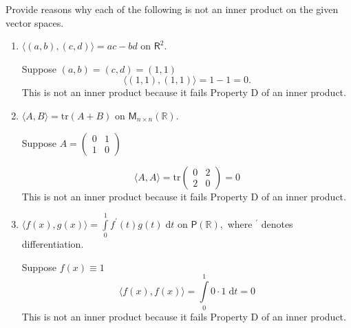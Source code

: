 Provide reasons why each of the following is not an inner product on
the given vector spaces.
\begin{enumerate}
\item $\langle(a,b),(c,d)\rangle = ac - bd$ on $\mathsf{R}^2.$

Suppose $(a,b) = (c,d) = (1,1)$
\begin{equation}
\langle (1,1),(1,1) \rangle = 1 - 1 = 0.
\end{equation}
This is not an inner product because it fails Property D of an inner
product.
\item $\langle A,B \rangle = \text{tr}(A+B)$ on $\mathsf{M}_{n\times
    n}(\mathbb{R}).$

Suppose $A = \left(\begin{smallmatrix} 0 & 1 \\ 1 &
    0\end{smallmatrix}\right)$

\begin{equation}
\langle A, A \rangle = \text{tr}\begin{pmatrix} 0  & 2 \\2 &
  0\end{pmatrix} = 0
\end{equation}
This is not an inner product because it fails Property D of an inner
product.
\item $\langle f(x),g(x) \rangle =
  \int\limits^1_0f^\prime(t)g(t) \; \mathrm{d}t$ on
  $\mathsf{P}(\mathbb{R}),$ where $^\prime$ denotes differentiation.

Suppose $f(x) \equiv 1$
\begin{equation}
\langle f(x),f(x) \rangle = \int\limits_0^1 0\cdot 1 \; \mathrm{d}t = 0
\end{equation}
This is not an inner product because it fails Property D of an inner
product.
\end{enumerate}
